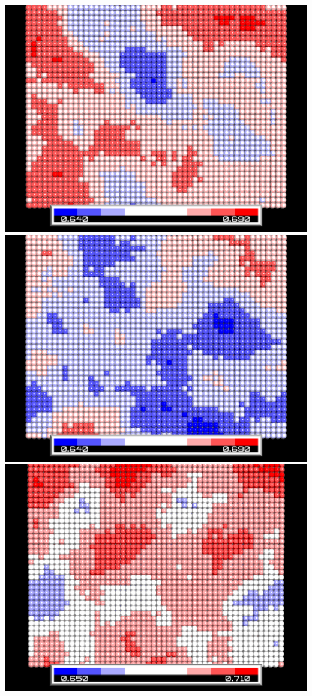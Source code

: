 \begin{center}
\includegraphics[resolution=100,scale=0.01]{Plots/glomepro/snap_STX-DPPG_2_do.png}
\includegraphics[resolution=100,scale=0.01]{Plots/glomepro/snap_STX-DPPG_2_up.png}
\includegraphics[resolution=100,scale=0.01]{Plots/glomepro/snap_STXrigid-DMPG_2_do.png}

\end{center}
